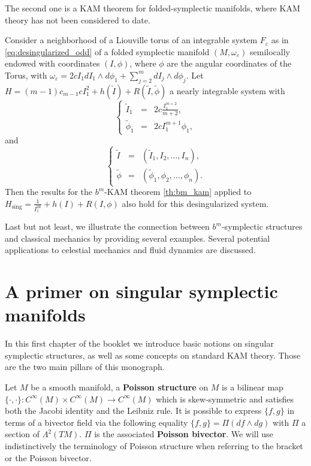 The second one is a KAM theorem for folded-symplectic manifolds, where KAM theory has not been considered to date.

\begin{theoremE}
Consider a neighborhood of a Liouville torus of an integrable system $F_\varepsilon$ as in \ref{eq:desingularized_odd} of a folded symplectic manifold $(M, \omega_\varepsilon)$ semilocally endowed with coordinates $(I,\phi)$, where $\phi$ are the angular coordinates of the Torus, with $\omega_\varepsilon = 2cI_1 dI_1 \wedge d\phi_1 + \sum_{j=2}^m dI_j \wedge d\phi_j$.
Let $H = (m-1)c_{m-1} cI_1^2 + h(\tilde I) + R(\tilde I, \tilde \phi)$ a nearly integrable system with
$$
\left\{
\begin{array}{rcl}
\tilde I_1 & = &  2c\frac{I_1^{m+2}}{m+2},\\
\tilde \phi_1 & = &  2c I_1^{m+1} \phi_1 ,
\end{array}
\right.
$$
and
$$
\left\{
\begin{array}{rcl}
\tilde I & = & (\tilde I_1, I_2, \ldots, I_n),\\
\tilde \phi & = & (\tilde \phi_1, \phi_2, \ldots, \phi_n).
\end{array}
\right.
$$
Then the results for the $b^m$-KAM theorem \ref{th:bm_kam} applied to $H_{\text{sing}} = \frac{1}{I_1^{2k}} + h(I) + R(I,\phi)$ also hold for this desingularized system.
\end{theoremE}

Last but not least, we illustrate the connection between $b^m$-symplectic structures and classical mechanics by providing several examples. Several potential applications to celestial mechanics and fluid dynamics are discussed.


\chapter{A primer on singular symplectic manifolds}
\label{ch:preliminaries}

In this first chapter of the booklet we introduce basic notions
 on singular symplectic structures, as well as some concepts on standard KAM theory. Those are the two main pillars of this monograph.

{Let $M$ be a smooth manifold, a \textbf{Poisson structure} on $M$ is a bilinear map
$\{\cdot, \cdot\}:C^\infty(M)\times C^\infty(M) \rightarrow C^\infty(M)$
which is skew-symmetric and satisfies both the Jacobi identity and the Leibniz rule. It is possible to express $\{f,g\}$ in terms of a bivector field via the following equality $\{f,g\}=\Pi(df\wedge dg)$ with $\Pi$ a section of $\Lambda^2(TM)$. $\Pi$ is the associated \textbf{Poisson bivector}. We will use indistinctively the {terminology} of Poisson structure when referring to the bracket or the Poisson bivector. }

